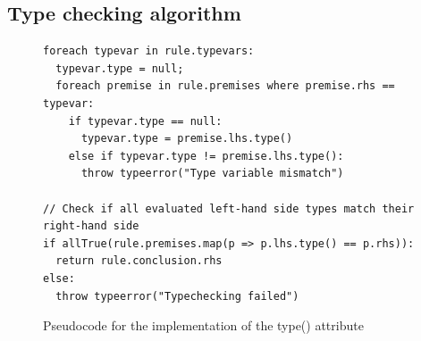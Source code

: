 \documentclass[nofilelist]{cslthse-msc}
\begin{document}
\subsection{Type checking algorithm}\label{typecheckingalgorithm}


\begin{figure}[bhpt]
\begin{lstlisting}[]
foreach typevar in rule.typevars:
  typevar.type = null;
  foreach premise in rule.premises where premise.rhs == typevar:
    if typevar.type == null:
      typevar.type = premise.lhs.type()
    else if typevar.type != premise.lhs.type():
      throw typeerror("Type variable mismatch")

// Check if all evaluated left-hand side types match their right-hand side
if allTrue(rule.premises.map(p => p.lhs.type() == p.rhs)):
  return rule.conclusion.rhs
else:
  throw typeerror("Typechecking failed")
\end{lstlisting}
  \caption{Pseudocode for the implementation of the type() attribute}
  \label{psuedotype}
\end{figure}
\end{document}
